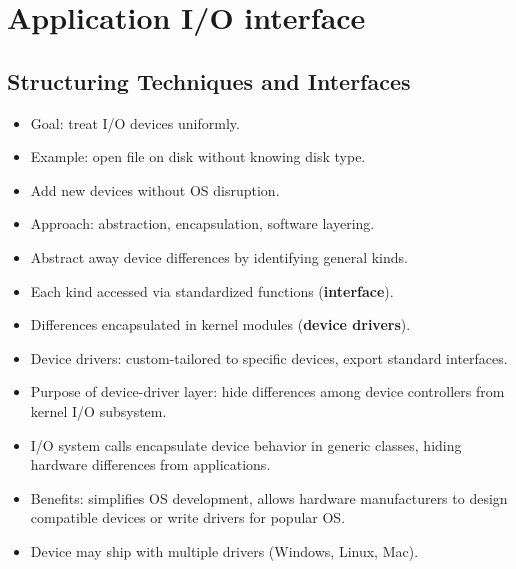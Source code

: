 \section{Application I/O interface}

\subsection{Structuring Techniques and Interfaces}
\begin{itemize}
    \item Goal: treat I/O devices uniformly.
    \item Example: open file on disk without knowing disk type.
    \item Add new devices without OS disruption.
    \item Approach: abstraction, encapsulation, software layering.
    \item Abstract away device differences by identifying general kinds.
    \item Each kind accessed via standardized functions (\textbf{interface}).
    \item Differences encapsulated in kernel modules (\textbf{device drivers}).
    \item Device drivers: custom-tailored to specific devices, export standard interfaces.
    \item Purpose of device-driver layer: hide differences among device controllers from kernel I/O subsystem.
    \item I/O system calls encapsulate device behavior in generic classes, hiding hardware differences from applications.
    \item Benefits: simplifies OS development, allows hardware manufacturers to design compatible devices or write drivers for popular OS.
    \item Device may ship with multiple drivers (Windows, Linux, Mac).
\end{itemize}

